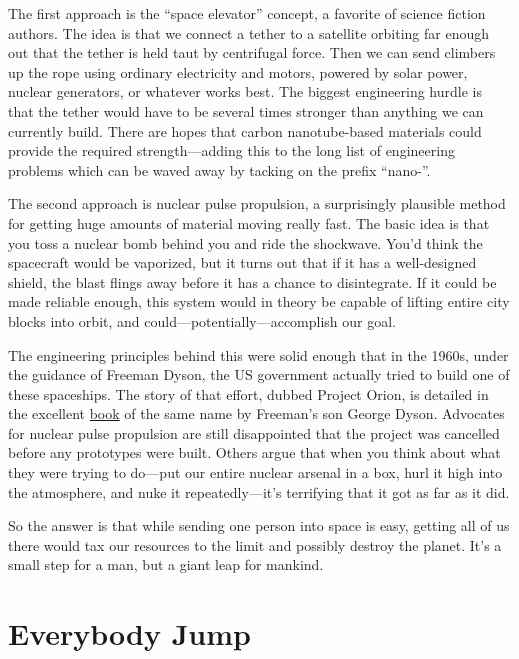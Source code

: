 {The first approach is the “space elevator” concept, a favorite of science fiction authors. The idea is that we connect a tether to a satellite orbiting far enough out that the tether is held taut by centrifugal force. Then we can send climbers up the rope using ordinary electricity and motors, powered by solar power, nuclear generators, or whatever works best. The biggest engineering hurdle is that the tether would have to be several times stronger than anything we can currently build. There are hopes that carbon nanotube-based materials could provide the required strength—adding this to the long list of engineering problems which can be waved away by tacking on the prefix “nano-”.}

{The second approach is nuclear pulse propulsion, a surprisingly plausible method for getting huge amounts of material moving really fast. The basic idea is that you toss a nuclear bomb behind you and ride the shockwave. You’d think the spacecraft would be vaporized, but it turns out that if it has a well-designed shield, the blast flings away before it has a chance to disintegrate. If it could be made reliable enough, this system would in theory be capable of lifting entire city blocks into orbit, and could—potentially—accomplish our goal.}

{The engineering principles behind this were solid enough that in the 1960s, under the guidance of Freeman Dyson, the US government actually tried to build one of these spaceships. The story of that effort, dubbed Project Orion, is detailed in the excellent \href{http://www.amazon.com/Project-Orion-Story-Atomic-Spaceship/dp/0805059857}{book} of the same name by Freeman’s son George Dyson. Advocates for nuclear pulse propulsion are still disappointed that the project was cancelled before any prototypes were built. Others argue that when you think about what they were trying to do—put our entire nuclear arsenal in a box, hurl it high into the atmosphere, and nuke it repeatedly—it’s terrifying that it got as far as it did.}

{So the answer is that while sending one person into space is easy, getting all of us there would tax our resources to the limit and possibly destroy the planet. It’s a small step for a man, but a giant leap for mankind.}

{
\chapter{Everybody Jump}
}

